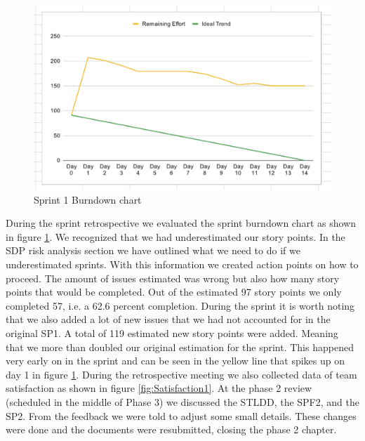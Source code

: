 \documentclass{article}
\begin{document}
\begin{figure}[h!]
    \centering
    \includegraphics[scale=0.6]{pfrFigures/Sprint1.png}
    \caption{Sprint 1 Burndown chart}
    \label{fig:Burndown1}
\end{figure}

During the sprint retrospective we evaluated the sprint burndown chart as shown in figure \ref{fig:Burndown1}. We recognized that we had underestimated our story points. In the SDP risk analysis section we have outlined what we need to do if we underestimated sprints. With this information we created action points on how to proceed. The amount of issues estimated was wrong but also how many story points that would be completed. Out of the estimated 97 story points we only completed 57, i.e. a 62.6 percent completion. During the sprint it is worth noting that we also added a lot of new issues that we had not accounted for in the original SP1. A total of 119 estimated new story points were added. Meaning that we more than doubled our original estimation for the sprint. This happened very early on in the sprint and can be seen in the yellow line that spikes up on day 1 in figure \ref{fig:Burndown1}. During the retrospective meeting we also collected data of team satisfaction as shown in figure \ref{fig:Satisfaction1}. At the phase 2 review (scheduled in the middle of Phase 3) we discussed the STLDD, the SPF2, and the SP2. From the feedback we were told to adjust some small details. These changes were done and the documents were resubmitted, closing the phase 2 chapter.  
\end{document}
